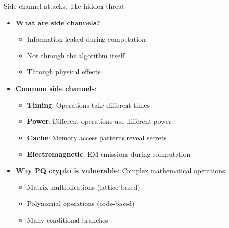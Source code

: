 \documentclass[aspectratio=169, lualatex, handout]{beamer}
\begin{document}
\begin{frame}{Side-channel attacks: The hidden threat}
	\begin{itemize}
		\item \textbf{What are side channels?}
		      \begin{itemize}
			      \item Information leaked during computation
			      \item Not through the algorithm itself
			      \item Through physical effects
		      \end{itemize}
		\item \textbf{Common side channels}:
		      \begin{itemize}
			      \item \textbf{Timing}: Operations take different times
			      \item \textbf{Power}: Different operations use different power
			      \item \textbf{Cache}: Memory access patterns reveal secrets
			      \item \textbf{Electromagnetic}: EM emissions during computation
		      \end{itemize}
		\item \textbf{Why PQ crypto is vulnerable}: Complex mathematical operations
		      \begin{itemize}
			      \item Matrix multiplications (lattice-based)
			      \item Polynomial operations (code-based)
			      \item Many conditional branches
		      \end{itemize}
	\end{itemize}
\end{frame}
\end{document}
